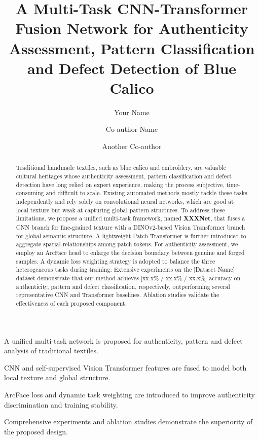 \documentclass[preprint,12pt,a4paper]{elsarticle}
\begin{document}
\begin{frontmatter}

\title{A Multi-Task CNN-Transformer Fusion Network for Authenticity Assessment, Pattern Classification and Defect Detection of Blue Calico}

\author[1]{Your Name}
\author[1]{Co-author Name}
\author[2]{Another Co-author}



\begin{abstract}
Traditional handmade textiles, such as blue calico and embroidery, are valuable cultural heritages whose authenticity assessment, pattern classification and defect detection have long relied on expert experience, making the process subjective, time-consuming and difficult to scale.
Existing automated methods mostly tackle these tasks independently and rely solely on convolutional neural networks, which are good at local texture but weak at capturing global pattern structures.
To address these limitations, we propose a unified multi-task framework, named \textbf{XXXNet}, that fuses a CNN branch for fine-grained texture with a DINOv2-based Vision Transformer branch for global semantic structure.
A lightweight Patch Transformer is further introduced to aggregate spatial relationships among patch tokens.
For authenticity assessment, we employ an ArcFace head to enlarge the decision boundary between genuine and forged samples.
A dynamic loss weighting strategy is adopted to balance the three heterogeneous tasks during training.
Extensive experiments on the [Dataset Name] dataset demonstrate that our method achieves [xx.x\% / xx.x\% / xx.x\%] accuracy on authenticity, pattern and defect classification, respectively, outperforming several representative CNN and Transformer baselines.
Ablation studies validate the effectiveness of each proposed component.
\end{abstract}

\begin{highlights}
\item A unified multi-task network is proposed for authenticity, pattern and defect analysis of traditional textiles.
\item CNN and self-supervised Vision Transformer features are fused to model both local texture and global structure.
\item ArcFace loss and dynamic task weighting are introduced to improve authenticity discrimination and training stability.
\item Comprehensive experiments and ablation studies demonstrate the superiority of the proposed design.
\end{highlights}


\end{frontmatter}
\end{document}
